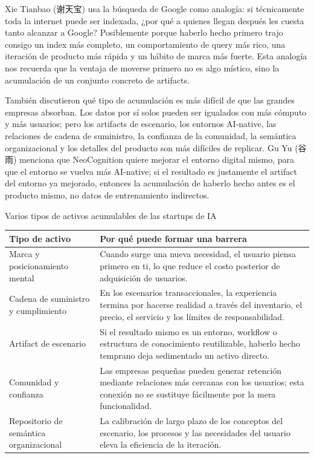 Xie Tianbao (谢天宝) usa la búsqueda de Google como analogía: si técnicamente toda la internet puede ser indexada, ¿por qué a quienes llegan después les cuesta tanto alcanzar a Google? Posiblemente porque haberlo hecho primero trajo consigo un index más completo, un comportamiento de query más rico, una iteración de producto más rápida y un hábito de marca más fuerte. Esta analogía nos recuerda que la ventaja de moverse primero no es algo místico, sino la acumulación de un conjunto concreto de artifacts.

También discutieron qué tipo de acumulación es más difícil de que las grandes empresas absorban. Los datos por sí solos pueden ser igualados con más cómputo y más usuarios; pero los artifacts de escenario, los entornos AI-native, las relaciones de cadena de suministro, la confianza de la comunidad, la semántica organizacional y los detalles del producto son más difíciles de replicar. Gu Yu (谷雨) menciona que NeoCognition quiere mejorar el entorno digital mismo, para que el entorno se vuelva más AI-native; si el resultado es justamente el artifact del entorno ya mejorado, entonces la acumulación de haberlo hecho antes es el producto mismo, no datos de entrenamiento indirectos.

\begin{knowledgebox}{Varios tipos de activos acumulables de las startups de IA}
\begin{tabularx}{\textwidth}{>{\raggedright\arraybackslash}p{} Y}
\toprule
Tipo de activo & Por qué puede formar una barrera \\
\midrule
Marca y posicionamiento mental & Cuando surge una nueva necesidad, el usuario piensa primero en ti, lo que reduce el costo posterior de adquisición de usuarios. \\
Cadena de suministro y cumplimiento & En los escenarios transaccionales, la experiencia termina por hacerse realidad a través del inventario, el precio, el servicio y los límites de responsabilidad. \\
Artifact de escenario & Si el resultado mismo es un entorno, workflow o estructura de conocimiento reutilizable, haberlo hecho temprano deja sedimentado un activo directo. \\
Comunidad y confianza & Las empresas pequeñas pueden generar retención mediante relaciones más cercanas con los usuarios; esta conexión no se sustituye fácilmente por la mera funcionalidad. \\
Repositorio de semántica organizacional & La calibración de largo plazo de los conceptos del escenario, los procesos y las necesidades del usuario eleva la eficiencia de la iteración. \\
\bottomrule
\end{tabularx}
\end{knowledgebox}

